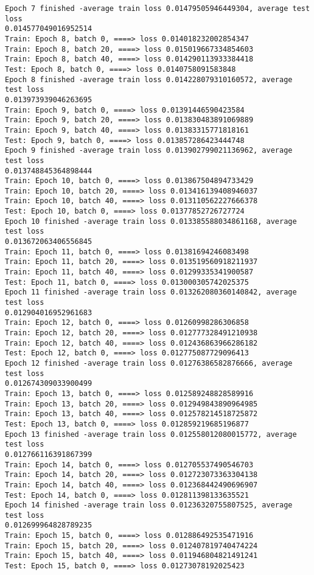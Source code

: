 \documentclass[11pt]{article}
\begin{document}
\begin{Verbatim}[commandchars=\\\{\}]
Epoch 7 finished -average train loss 0.01479505946449304, average test loss
0.014577049016952514
Train: Epoch 8, batch 0, ====> loss 0.014018232002854347
Train: Epoch 8, batch 20, ====> loss 0.015019667334854603
Train: Epoch 8, batch 40, ====> loss 0.014290113933384418
Test: Epoch 8, batch 0, ====> loss 0.0140758091583848
Epoch 8 finished -average train loss 0.014228079310160572, average test loss
0.013973939046263695
Train: Epoch 9, batch 0, ====> loss 0.01391446590423584
Train: Epoch 9, batch 20, ====> loss 0.013830483891069889
Train: Epoch 9, batch 40, ====> loss 0.01383315771818161
Test: Epoch 9, batch 0, ====> loss 0.013857286423444748
Epoch 9 finished -average train loss 0.013902799021136962, average test loss
0.013748845364898444
Train: Epoch 10, batch 0, ====> loss 0.013867504894733429
Train: Epoch 10, batch 20, ====> loss 0.013416139408946037
Train: Epoch 10, batch 40, ====> loss 0.013110562227666378
Test: Epoch 10, batch 0, ====> loss 0.01377852726727724
Epoch 10 finished -average train loss 0.013385588034861168, average test loss
0.013672063406556845
Train: Epoch 11, batch 0, ====> loss 0.01381694246083498
Train: Epoch 11, batch 20, ====> loss 0.013519560918211937
Train: Epoch 11, batch 40, ====> loss 0.01299335341900587
Test: Epoch 11, batch 0, ====> loss 0.013000305742025375
Epoch 11 finished -average train loss 0.013262080360140842, average test loss
0.012904016952961683
Train: Epoch 12, batch 0, ====> loss 0.01260998286306858
Train: Epoch 12, batch 20, ====> loss 0.012777328491210938
Train: Epoch 12, batch 40, ====> loss 0.012436863966286182
Test: Epoch 12, batch 0, ====> loss 0.012775087729096413
Epoch 12 finished -average train loss 0.01276386582876666, average test loss
0.012674309033900499
Train: Epoch 13, batch 0, ====> loss 0.012589248828589916
Train: Epoch 13, batch 20, ====> loss 0.012949843890964985
Train: Epoch 13, batch 40, ====> loss 0.012578214518725872
Test: Epoch 13, batch 0, ====> loss 0.012859219685196877
Epoch 13 finished -average train loss 0.012558012080015772, average test loss
0.012766116391867399
Train: Epoch 14, batch 0, ====> loss 0.012705537490546703
Train: Epoch 14, batch 20, ====> loss 0.012723073363304138
Train: Epoch 14, batch 40, ====> loss 0.012368442490696907
Test: Epoch 14, batch 0, ====> loss 0.012811398133635521
Epoch 14 finished -average train loss 0.01236320755807525, average test loss
0.012699964828789235
Train: Epoch 15, batch 0, ====> loss 0.012886492535471916
Train: Epoch 15, batch 20, ====> loss 0.012407819740474224
Train: Epoch 15, batch 40, ====> loss 0.011946804821491241
Test: Epoch 15, batch 0, ====> loss 0.01273078192025423

\end{Verbatim}
\end{document}
